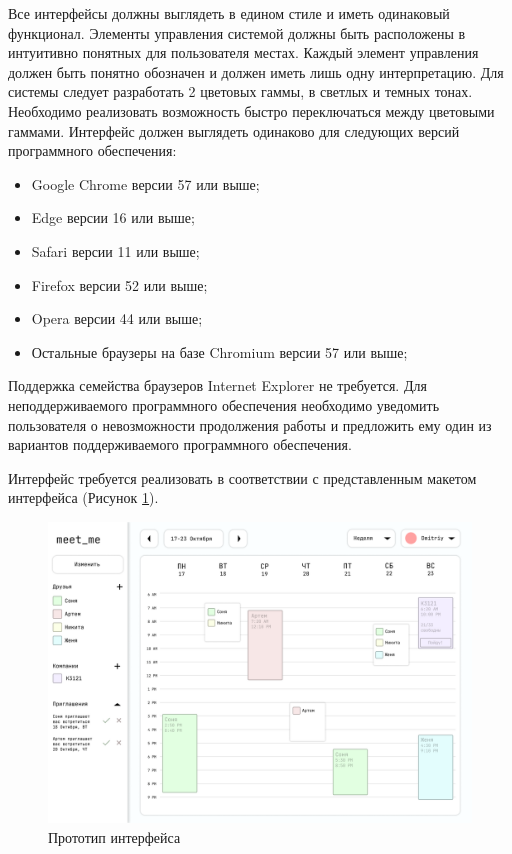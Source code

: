 \documentclass[14pt]{extreport}
\begin{document}
            Все интерфейсы должны выглядеть в едином стиле и иметь одинаковый функционал. Элементы управления системой должны быть расположены в интуитивно понятных для пользователя местах. Каждый элемент управления должен быть понятно обозначен и должен иметь лишь одну интерпретацию. Для системы следует разработать 2 цветовых гаммы, в светлых и темных тонах. Необходимо реализовать возможность быстро переключаться между цветовыми гаммами. Интерфейс должен выглядеть одинаково для следующих версий программного обеспечения:

            \begin{itemize}
                \item Google Chrome версии 57 или выше;
                \item Edge версии 16 или выше;
                \item Safari версии 11 или выше;
                \item Firefox версии 52 или выше; 
                \item Opera версии 44 или выше;
                \item Остальные браузеры на базе Chromium версии 57 или выше;
            \end{itemize}

            Поддержка семейства браузеров Internet Explorer не требуется. Для неподдерживаемого программного обеспечения необходимо уведомить пользователя о невозможности продолжения работы и предложить ему один из вариантов поддерживаемого программного обеспечения. 

            Интерфейс требуется реализовать в соответствии с представленным макетом интерфейса (Рисунок \ref{fig:d1}). 
            \begin{figure}[h]   
                \centering
                \includegraphics[width=0.9\linewidth]{./../lab3/prototype.png}
                \caption{ Прототип интерфейса}
                \label{fig:d1}
            \end{figure}
\end{document}
